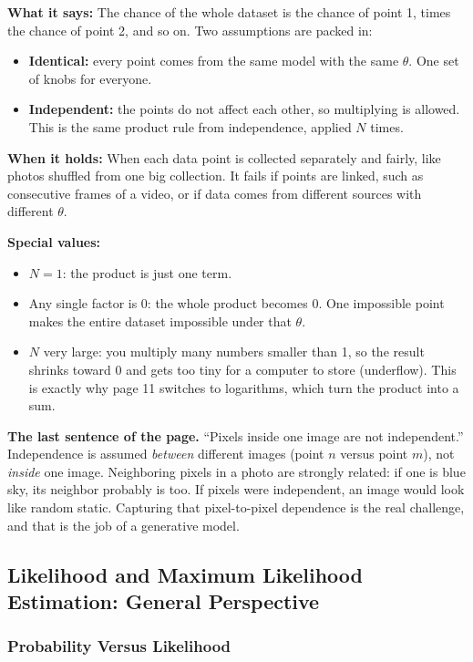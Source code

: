 \textbf{What it says:} The chance of the whole dataset is the chance of point 1, times the chance of point 2, and so on. Two assumptions are packed in:
\begin{itemize}
  \item \textbf{Identical:} every point comes from the same model with the same $\theta$. One set of knobs for everyone.
  \item \textbf{Independent:} the points do not affect each other, so multiplying is allowed. This is the same product rule from independence, applied $N$ times.
\end{itemize}

\textbf{When it holds:} When each data point is collected separately and fairly, like photos shuffled from one big collection. It fails if points are linked, such as consecutive frames of a video, or if data comes from different sources with different $\theta$.

\textbf{Special values:}
\begin{itemize}
  \item $N = 1$: the product is just one term.
  \item Any single factor is 0: the whole product becomes 0. One impossible point makes the entire dataset impossible under that $\theta$.
  \item $N$ very large: you multiply many numbers smaller than 1, so the result shrinks toward 0 and gets too tiny for a computer to store (underflow). This is exactly why page 11 switches to logarithms, which turn the product into a sum.
\end{itemize}

\textbf{The last sentence of the page.} ``Pixels inside one image are not independent.'' Independence is assumed \emph{between} different images (point $n$ versus point $m$), not \emph{inside} one image. Neighboring pixels in a photo are strongly related: if one is blue sky, its neighbor probably is too. If pixels were independent, an image would look like random static. Capturing that pixel-to-pixel dependence is the real challenge, and that is the job of a generative model.

\subsection*{Likelihood and Maximum Likelihood Estimation: General Perspective}

\subsubsection*{Probability Versus Likelihood}

